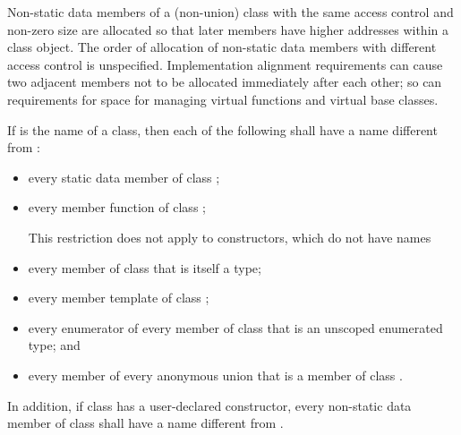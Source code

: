 \pnum
\begin{note}
%
Non-static data members of a (non-union) class
with the same access control and
non-zero size
are allocated so that later
members have higher addresses within a class object.
%
The order of allocation of non-static data members
with different access control
is unspecified.
Implementation alignment requirements can cause two adjacent members
not to be allocated immediately after each other; so can requirements
for space for managing virtual functions and
virtual base classes.
\end{note}

\pnum
If  is the name of a class, then each of the following shall
have a name different from :
\begin{itemize}
\item every static data member of class ;

\item every member function of class ;
\begin{note}
This restriction does not apply to constructors, which do not have
names
\end{note}%

\item every member of class  that is itself a type;

\item every member template of class ;

\item every enumerator of every member of class  that is an
unscoped enumerated type; and

\item every member of every anonymous union that is a member of class
.
\end{itemize}

\pnum
In addition, if class  has a user-declared
constructor, every non-static data member of class
 shall have a name different from .

